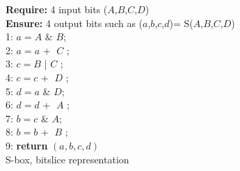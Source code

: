 \documentclass[preprint]{transcrypto}
\begin{document}
	\begin{algorithm}
       \textbf{Require:} 4 input bits ($A$,$B$,$C$,$D$)\\
\textbf{Ensure:} 4 output bits such as ($a$,$b$,$c$,$d$)= S($A$,$B$,$C$,$D$)\\
1: $a = A$ $\&$ $B$; \\
2: $a = a$ \textcircled{+} $C$ ;\\
3: $c = B$ | $C$ ; \\
4: $c = c$ \textcircled{+} $D$ ;\\
5: $d = a$ $\&$ $D$; \\
6: $d = d$ \textcircled{+} $A$ ;\\
7: $b = c$ $\&$ $A$; \\
8: $b = b$ \textcircled{+} $B$ ;\\
9: \textbf{return} $(a,b,c,d)$  \\
         \caption{S-box, bitslice representation}
        \end{algorithm}
\end{document}
